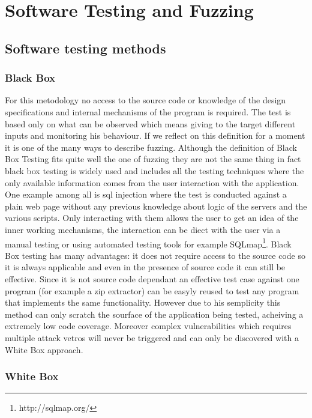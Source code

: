 \documentclass[../main.tex]{subfiles}
\begin{document}
\chapter{Software Testing and Fuzzing}
\label{chap:fuzzing}

\section{Software testing methods}

\subsection{Black Box}

For this metodology no access to the source code or knowledge of the design
specifications and internal mechanisms of the program is required. The test is
based only on what can be observed which means giving to the target different
inputs and monitoring his behaviour. If we reflect on this definition for a
moment it is one of the many ways to describe fuzzing. Although the definition
of Black Box Testing fits quite well the one of fuzzing they are not the same
thing in fact black box testing is widely used and includes all the testing
techniques where the only available information comes from the user interaction
with the application. One example among all is sql injection where the test is
conducted against a plain web page without any previous knowledge about logic of
the servers and the various scripts. Only interacting with them allows the user
to get an idea of the inner working mechanisms, the interaction can be diect
with the user via a manual testing or using automated testing tools for example
SQLmap\footnote{http://sqlmap.org/}. Black Box testing has many advantages: it
does not require access to the source code so it is always applicable and even
in the presence of source code it can still be effective. Since it is not source
code dependant an effective test case against one program (for example a zip
extractor) can be easyly reused to test any program that implements the same
functionality. However due to his semplicity this method can only scratch the
sourface of the application being tested, acheiving a extremely low code
coverage. Moreover complex vulnerabilities which requires multiple attack vetros
will never be triggered and can only be discovered with a White Box approach.

\subsection{White Box}
\end{document}
